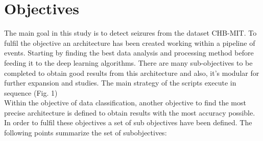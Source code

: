 \section{Objectives}
\label{sec-objectives}
The main goal in this study is to detect seizures from the dataset CHB-MIT. To fulfil the objective an architecture has been created working within a pipeline of events. Starting by finding the best data analysis and processing method before feeding it to the deep learning algorithms. There are many sub-objectives to be completed to obtain good results from this architecture and also, it’s modular for further expansion and studies. The main strategy of the scripts execute in sequence (Fig. 1)
\\

Within the objective of data classification, another objective to find the most precise architecture is defined to obtain results with the most accuracy possible. In order to fulfil these objectives a set of sub objectives have been defined. The following points summarize the set of subobjectives:
\\
